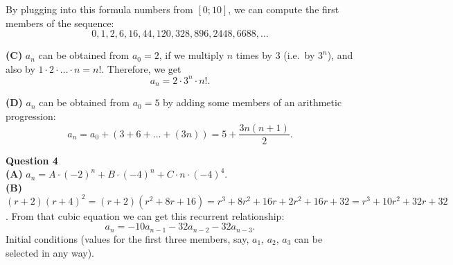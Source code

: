 \documentclass[jou]{apa6}
\begin{document}
By plugging into this formula numbers from $[0;10]$, 
we can compute the first members of the sequence:
$$0,1,2,6,16,44,120,328,896,2448,6688,\ldots$$

{\bf (C)} $a_n$ can be obtained from $a_0 = 2$, 
if we multiply $n$ times by $3$ (i.e.\ by $3^n$), 
and also by $1 \cdot 2 \cdot \ldots \cdot n = n!$. 
Therefore, we get
$$a_n = 2 \cdot 3^n \cdot n!.$$

{\bf (D)} $a_n$ can be obtained from $a_0 = 5$ by 
adding some members of an arithmetic progression:
$$a_n = a_0 + (3 + 6 + \ldots + (3n)) = 5 + \frac{3n(n+1)}{2}.$$





\vspace{10pt}
{\bf Question 4}\\
{\bf (A)} $a_n = A\cdot(-2)^n + B\cdot(-4)^n + C\cdot n \cdot (-4)^4$.\\
{\bf (B)} $(r + 2)(r + 4)^2 = (r + 2)(r^2 + 8r + 16) = r^3 + 8r^2 + 16r + 2r^2 + 16r + 32 = r^3 + 10r^2 + 32r + 32$. 
From that cubic equation we can get this recurrent relationship: 
$$a_{n} = -10a_{n-1} - 32a_{n-2} - 32a_{n-3}.$$
Initial conditions (values for the first three members, say, $a_1$, $a_2$, $a_3$ can be selected in any way). 
\end{document}

